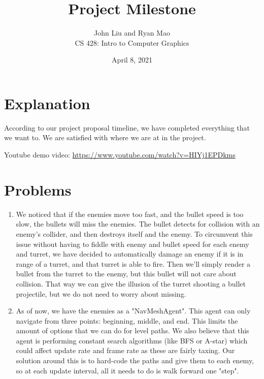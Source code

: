 \documentclass[12pt, twoside]{article}
\newcommand{\name}{John Liu and Ryan Mao}
\newcommand{\class}{CS 428: Intro to Computer Graphics}
\newcommand{\hwTitle}{Project Milestone} %
\newcommand{\due}{April 8, 2021} %
\begin{document}
 
 
\title{\hwTitle} %
\author{\name\\  %
\class} %
\date{\due}
 
\maketitle

\section*{Explanation}
According to our project proposal timeline, we have completed everything that we want to. We are satisfied with where we are at in the project.

\noindent
Youtube demo video: 
\url{https://www.youtube.com/watch?v=HIYj1EPDkms}
\section*{Problems}
\begin{enumerate}
    \item 
        We noticed that if the enemies move too fast, and the bullet speed is too slow, the bullets will miss the enemies. The bullet detects for collision with an enemy's collider, and then destroys itself and the enemy. To circumvent this issue without having to fiddle with enemy and bullet speed for each enemy and turret, we have decided to automatically damage an enemy if it is in range of a turret, and that turret is able to fire. Then we'll simply render a bullet from the turret to the enemy, but this bullet will not care about collision. That way we can give the illusion of the turret shooting a bullet projectile, but we do not need to worry about missing.
    \item
        As of now, we have the enemies as a "NavMeshAgent". This agent can only navigate from three points: beginning, middle, and end. This limits the amount of options that we can do for level paths. We also believe that this agent is performing constant search algorithms (like BFS or A-star) which could affect update rate and frame rate as these are fairly taxing. Our solution around this is to hard-code the paths and give them to each enemy, so at each update interval, all it needs to do is walk forward one "step".
\end{enumerate}
\end{document}
